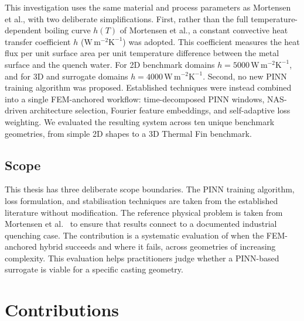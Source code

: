 This investigation uses the same material and process parameters as Mortensen
et al., with two deliberate simplifications.
First, rather than the full temperature-dependent boiling curve $h(T)$ of
Mortensen et al., a constant convective heat transfer coefficient
$h$ ($\mathrm{W\,m^{-2}K^{-1}}$) was adopted.
This coefficient measures the heat flux per unit surface area per unit
temperature difference between the metal surface and the quench water.
For 2D benchmark domains $h = 5000\,\mathrm{W\,m^{-2}K^{-1}}$, and for 3D and
surrogate domains $h = 4000\,\mathrm{W\,m^{-2}K^{-1}}$.
Second, no new PINN training algorithm was proposed.
Established techniques were instead combined into a single FEM-anchored
workflow: time-decomposed PINN windows, NAS-driven architecture selection,
Fourier feature embeddings, and self-adaptive loss weighting.
We evaluated the resulting system across ten unique benchmark geometries,
from simple 2D shapes to a 3D Thermal Fin benchmark.

\subsection{Scope}
\label{subsec:scope}

This thesis has three deliberate scope boundaries.
The PINN training algorithm, loss formulation, and stabilisation techniques are
taken from the established literature without modification.
The reference physical problem is taken from Mortensen
et al.~\cite{mortensen2026} to ensure that results connect to a documented
industrial quenching case.
The contribution is a systematic evaluation of when the FEM-anchored hybrid
succeeds and where it fails, across geometries of increasing complexity.
This evaluation helps practitioners judge whether a PINN-based surrogate is
viable for a specific casting geometry.

\section{Contributions}
\label{sec:contributions}

